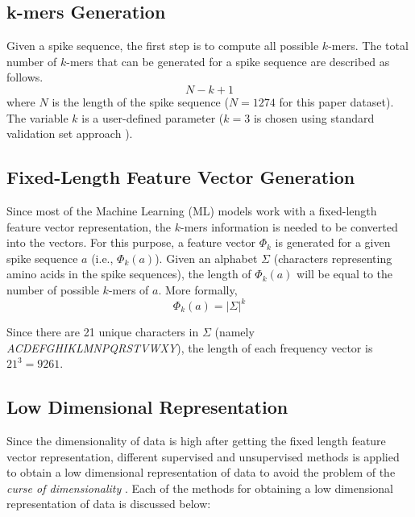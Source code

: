 \documentclass[%
 aip,
 jmp,%
 amsmath,amssymb,
 reprint,%
]{revtex4-2}
\begin{document}
\subsection{k-mers Generation}
Given a spike sequence, the first step is to compute all possible $k$-mers. The total number of $k$-mers
that can be generated for a spike sequence are described as follows.
\begin{equation}
    N - k + 1
\end{equation}
where $N$ is the length of the spike sequence ($N=1274$ for this paper dataset). The variable $k$ is a
user-defined parameter ($k=3$ is chosen using standard validation set approach \cite{ref42}).

\subsection{Fixed-Length Feature Vector Generation}
Since most of the Machine Learning (ML) models work with a fixed-length feature vector representation,
the $k$-mers information is needed to be converted into the vectors. For this purpose, a feature vector
$\Phi_k$ is generated for a given spike sequence $a$ (i.e., $\Phi_k(a)$). Given an alphabet $\Sigma$
(characters representing amino acids in the spike sequences), the length of $\Phi_k(a)$ will be equal to
the number of possible $k$-mers of $a$. More formally,
\begin{equation}
    \Phi_k(a)=|\Sigma|^k
\end{equation}

Since there are 21 unique characters in $\Sigma$ (namely \emph{ACDEFGHIKLMNPQRSTVWXY}), the length
of each frequency vector is $21^3=9261$.

\subsection{Low Dimensional Representation}
Since the dimensionality of data is high after getting the fixed length feature vector representation,
different supervised and unsupervised methods is applied to obtain a low dimensional representation of
data to avoid the problem of the \emph{curse of dimensionality} \cite{ref35, ref43}. Each of the methods for
obtaining a low dimensional representation of data is discussed below:
\end{document}
